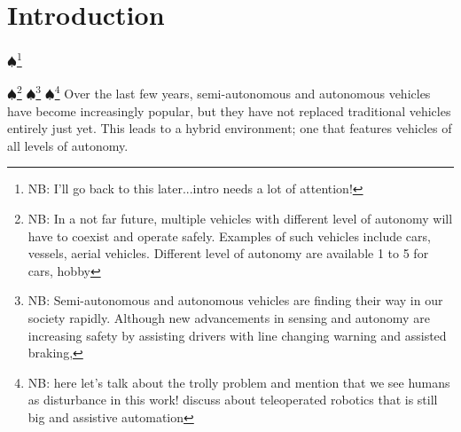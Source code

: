 \documentclass[letterpaper, 10 pt, conference]{ieeeconf}  %
\newcommand\NB[1]{$\spadesuit$\footnote{NB: #1}}
\begin{document}
\section{Introduction}

    
    

\NB{I'll go back to this later...intro needs a lot of attention!}
 
\NB{In a not far future, multiple vehicles with different level of autonomy will have to coexist and operate safely. Examples of such vehicles include cars, vessels, aerial vehicles. Different level of autonomy are available 1 to 5 for cars, hobby  }    
\NB{Semi-autonomous and autonomous vehicles are finding their way in our society rapidly. Although new advancements in sensing and autonomy are increasing safety by assisting drivers with line changing warning and assisted braking, } 
\NB{here let's talk about the trolly problem and mention that we see humans as disturbance in this work! discuss about teleoperated robotics that is still big and assistive automation}
Over the last few years, semi-autonomous and autonomous vehicles have become increasingly popular, but they have not replaced traditional vehicles entirely just yet. This leads to a hybrid environment; one that features vehicles of all levels of autonomy.
    
\end{document}
